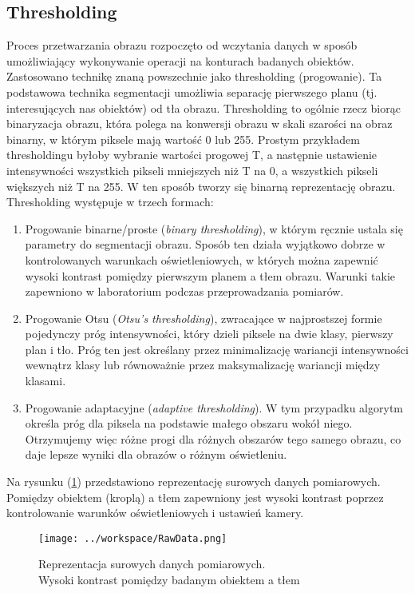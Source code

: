\documentclass[a4paper,11pt,twoside,openright]{article} %
\begin{document}
\subsection{Thresholding}
\noindent Proces przetwarzania obrazu rozpoczęto od wczytania danych w sposób umożliwiający wykonywanie operacji na konturach badanych obiektów. Zastosowano technikę znaną powszechnie jako thresholding (progowanie). Ta podstawowa technika segmentacji umożliwia separację pierwszego planu (tj. interesujących nas obiektów) od tła obrazu. Thresholding to ogólnie rzecz biorąc binaryzacja obrazu, która polega na konwersji obrazu w skali szarości na obraz binarny, w którym piksele mają wartość 0 lub 255. Prostym przykładem thresholdingu byłoby wybranie wartości progowej T, a następnie ustawienie intensywności wszystkich pikseli mniejszych niż T na 0, a wszystkich pikseli większych niż T na 255. W ten sposób tworzy się binarną reprezentację obrazu. Thresholding występuje w trzech formach:
\begin{enumerate}
\item Progowanie binarne/proste (\textit{binary thresholding}), w którym ręcznie ustala się parametry do segmentacji obrazu. Sposób ten działa wyjątkowo dobrze w kontrolowanych warunkach oświetleniowych, w których można zapewnić wysoki kontrast pomiędzy pierwszym planem a tłem obrazu. Warunki takie zapewniono w laboratorium podczas przeprowadzania pomiarów.
\item Progowanie Otsu (\textit{Otsu's thresholding}), zwracające w najprostszej formie pojedynczy próg intensywności, który dzieli piksele na dwie klasy, pierwszy plan i tło. Próg ten jest określany przez minimalizację wariancji intensywności wewnątrz klasy lub równoważnie przez maksymalizację wariancji między klasami.
\item Progowanie adaptacyjne (\textit{adaptive thresholding}). W tym przypadku algorytm określa próg dla piksela na podstawie małego obszaru wokół niego. Otrzymujemy więc różne progi dla różnych obszarów tego samego obrazu, co daje lepsze wyniki dla obrazów o różnym oświetleniu.
\end{enumerate}
\noindent Na rysunku (\ref{fig:raw_data}) przedstawiono reprezentację surowych danych pomiarowych. Pomiędzy obiektem (kroplą) a tłem zapewniony jest wysoki kontrast poprzez kontrolowanie warunków oświetleniowych i ustawień kamery. 
\captionsetup{skip=0pt}
\begin{figure}[!h]
\captionsetup{justification=centering}
\begin{center}
\texttt{[image: ../workspace/RawData.png]} 
\end{center}
\caption{Reprezentacja surowych danych pomiarowych.\\ Wysoki kontrast pomiędzy badanym obiektem a tłem}
\label{fig:raw_data}
\end{figure} 
\newpage
\end{document}
